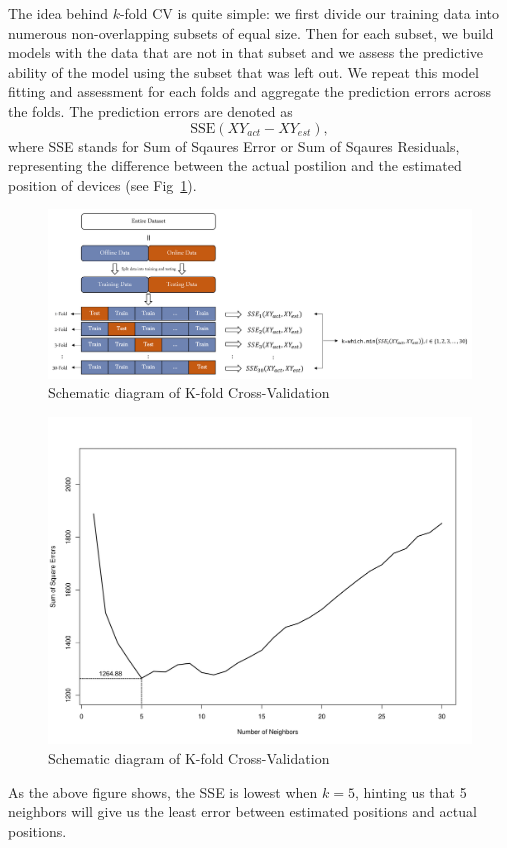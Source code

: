 \documentclass[12pt, conference]{IEEEtran}
\begin{document}
The idea behind $k$-fold CV is quite simple: we first divide our training data into numerous non-overlapping subsets of equal size. Then for each subset, we build models with the data that are not in that subset and we assess the predictive ability of the model using the subset that was left out. We repeat this model fitting and assessment for each folds and aggregate the prediction errors across the folds. The prediction errors are denoted as 
$$
  \text{SSE}(XY_{act}-XY_{est}),
$$ 
where SSE stands for Sum of Sqaures Error or Sum of Sqaures Residuals, representing the difference between the actual postilion and the estimated position of devices (see Fig~\ref{fig: K-Fold CV}).
\begin{figure}[htbp]
  \centerline{\includegraphics[width=\columnwidth]{img/K-Fold CV.png}}
  \caption{Schematic diagram of K-fold Cross-Validation}
  \label{fig: K-Fold CV}
\end{figure}

\begin{figure}[htbp]
  \centerline{\includegraphics[width=\columnwidth]{img/Plot-k-fold_CV-1.png}}
  \caption{Schematic diagram of K-fold Cross-Validation}
  \label{fig: Choice of K}
\end{figure}
As the above figure shows, the SSE is lowest when $k=5$, hinting us that 5 neighbors will give us the least error between estimated positions and actual positions.
\end{document}
